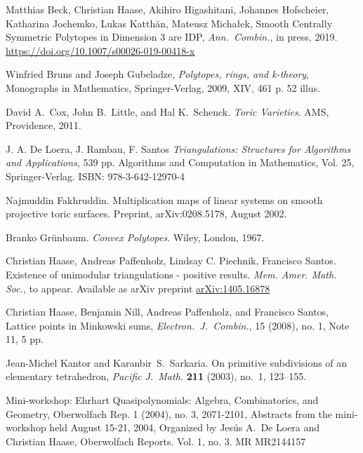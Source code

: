 \documentclass{amsart}
\theoremstyle{plain}
\theoremstyle{definition}
\begin{document}
\begin{thebibliography}{99}

Matthias Beck, Christian Haase, Akihiro Higashitani, Johannes Hofscheier, Katharina Jochemko, Lukas Katth\"an, Mateusz Micha{\l}ek,
Smooth Centrally Symmetric Polytopes in Dimension 3 are IDP,
\emph{Ann.~Combin.}, in press, 2019.
\url{https://doi.org/10.1007/s00026-019-00418-x}

Winfried Bruns and Joseph Gubeladze, \emph{Polytopes, rings, and k-theory}, Monographs in Mathematics,
  Springer-Verlag, 2009, XIV, 461 p. 52 illus.
  
David A.~Cox, John B.~Little, and Hal K.~Schenck.
{\em {T}oric {V}arieties}.
AMS, Providence, 2011.

J. A. De Loera, J. Rambau, F. Santos
\emph{Triangulations: Structures for Algorithms and Applications}, 539 pp.
Algorithms and Computation in Mathematics, Vol. 25, Springer-Verlag. 
ISBN: 978-3-642-12970-4

Najmuddin Fakhruddin.
\newblock Multiplication maps of linear systems on smooth projective toric surfaces.
  Preprint, arXiv:0208.5178, August 2002.

{Branko Gr\"unbaum}.
{\em {C}onvex {P}olytopes}.
Wiley, London, 1967.
  
Christian Haase, Andreas Paffenholz, Lindsay C. Piechnik, Francisco Santos. Existence of unimodular triangulations - positive results. 
 \emph{Mem. Amer. Math. Soc.}, to appear.
 Available as arXiv preprint \href{https://arxiv.org/abs/1405.1687}{arXiv:1405.16878}
 
Christian Haase, Benjamin Nill, Andreas Paffenholz, and Francisco Santos, Lattice points in Minkowski sums, 
\emph{Electron.~J.~Combin.}, 15 (2008), no. 1, Note 11, 5 pp.

Jean-Michel Kantor and Karanbir~S.\ Sarkaria.
On primitive subdivisions of an elementary tetrahedron, 
\emph{Pacific J.~Math.} \textbf{211} (2003), no.~1,  123--155.

Mini-workshop: Ehrhart Quasipolynomials: Algebra, Combinatorics, and Geometry, Oberwolfach Rep. 1 (2004), no. 3, 2071-2101, Abstracts from the mini-workshop held August 15-21, 2004, Organized by Jes\'us A.~De Loera and Christian Haase, Oberwolfach Reports. Vol. 1, no. 3. MR MR2144157


\end{thebibliography}
\end{document}
